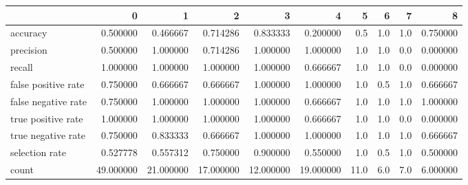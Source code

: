 \begin{tabular}{lrrrrrrrrr}
\toprule
{} &          0 &          1 &          2 &          3 &          4 &     5 &    6 &    7 &         8 \\
\midrule
accuracy            &   0.500000 &   0.466667 &   0.714286 &   0.833333 &   0.200000 &   0.5 &  1.0 &  1.0 &  0.750000 \\
precision           &   0.500000 &   1.000000 &   0.714286 &   1.000000 &   1.000000 &   1.0 &  1.0 &  0.0 &  0.000000 \\
recall              &   1.000000 &   1.000000 &   1.000000 &   1.000000 &   0.666667 &   1.0 &  1.0 &  0.0 &  0.000000 \\
false positive rate &   0.750000 &   0.666667 &   0.666667 &   1.000000 &   1.000000 &   1.0 &  0.5 &  1.0 &  0.666667 \\
false negative rate &   0.750000 &   1.000000 &   1.000000 &   1.000000 &   0.666667 &   1.0 &  1.0 &  1.0 &  1.000000 \\
true positive rate  &   1.000000 &   1.000000 &   1.000000 &   1.000000 &   0.666667 &   1.0 &  1.0 &  0.0 &  0.000000 \\
true negative rate  &   0.750000 &   0.833333 &   0.666667 &   1.000000 &   1.000000 &   1.0 &  1.0 &  1.0 &  0.666667 \\
selection rate      &   0.527778 &   0.557312 &   0.750000 &   0.900000 &   0.550000 &   1.0 &  0.5 &  1.0 &  0.500000 \\
count               &  49.000000 &  21.000000 &  17.000000 &  12.000000 &  19.000000 &  11.0 &  6.0 &  7.0 &  6.000000 \\
\bottomrule
\end{tabular}
